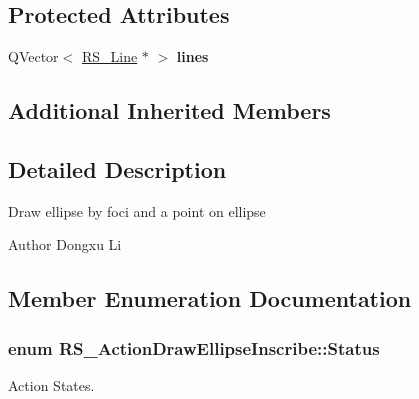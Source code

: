 \subsection*{Protected Attributes}
\begin{DoxyCompactItemize}
\item 
\hypertarget{classRS__ActionDrawEllipseInscribe_ab94e9da8e3b917f3827365be1c4d0007}{Q\-Vector$<$ \hyperlink{classRS__Line}{R\-S\-\_\-\-Line} $\ast$ $>$ {\bfseries lines}}\label{classRS__ActionDrawEllipseInscribe_ab94e9da8e3b917f3827365be1c4d0007}

\end{DoxyCompactItemize}
\subsection*{Additional Inherited Members}


\subsection{Detailed Description}
Draw ellipse by foci and a point on ellipse

\begin{DoxyAuthor}{Author}
Dongxu Li 
\end{DoxyAuthor}


\subsection{Member Enumeration Documentation}
\hypertarget{classRS__ActionDrawEllipseInscribe_a471a669b31ac8ffc7482c6c9990a304a}{
\subsubsection[{Status}]{\setlength{\rightskip}{0pt plus 5cm}enum {\bf R\-S\-\_\-\-Action\-Draw\-Ellipse\-Inscribe\-::\-Status}}}\label{classRS__ActionDrawEllipseInscribe_a471a669b31ac8ffc7482c6c9990a304a}
Action States. 

